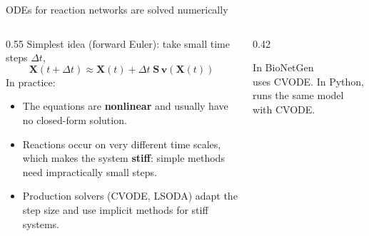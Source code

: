 \documentclass[aspectratio=169,10pt,t]{beamer}
\begin{document}
\begin{frame}{ODEs for reaction networks are solved numerically}
  \begin{columns}[T]
    \begin{column}{0.55\textwidth}
      Simplest idea (forward Euler): take small time steps $\Delta t$,
      \[
        \mathbf{X}(t+\Delta t) \approx \mathbf{X}(t) + \Delta t\;\mathbf{S}\,\mathbf{v}(\mathbf{X}(t))
      \]
      In practice:
      \begin{itemize}
        \item<2-> The equations are \textbf{nonlinear} and usually have no closed-form solution.
        \item<3-> Reactions occur on very different time scales, which makes the system
              \textbf{stiff}: simple methods need impractically small steps.
        \item<4-> Production solvers (CVODE, LSODA) adapt the step size and use implicit
              methods for stiff systems.
      \end{itemize}
    \end{column}
    \begin{column}{0.42\textwidth}
      \begin{block}{In BioNetGen}
        \small
         \\
        uses CVODE.
        \vskip1mm
        In Python,  runs the same
        model with CVODE.
      \end{block}
    \end{column}
  \end{columns}
\end{frame}
\end{document}
